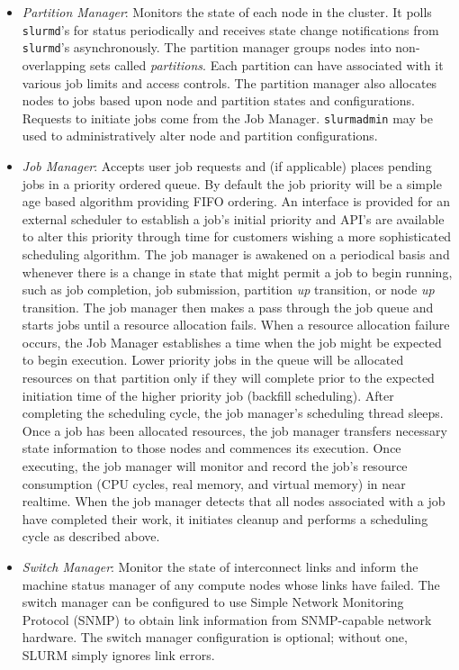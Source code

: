\begin{itemize}
\item {\em Partition Manager}: Monitors the state of each 
node in the cluster.  It polls {\tt slurmd}'s for status periodically and 
receives state change notifications from {\tt slurmd}'s asynchronously.
The partition manager groups nodes into non-overlapping sets 
called {\em partitions}. Each partition can have associated with 
it various job limits and access controls.
The partition manager also allocates nodes to jobs based upon 
node and partition states and configurations. Requests to initiate 
jobs come from the Job Manager.
{\tt slurmadmin} may be used to administratively alter node and 
partition configurations.

\item {\em Job Manager}: Accepts user job requests and (if applicable) 
places pending jobs in a priority ordered queue. By default the job 
priority will be a simple age based algorithm providing FIFO ordering. 
An interface is provided for an external scheduler to establish 
a job's initial priority and API's are available to alter this priority 
through time for customers wishing a more sophisticated scheduling algorithm.
The job manager is awakened on a periodical basis and whenever there is a change in state that 
might permit a job to begin running, such as job completion, job submission, 
partition {\em up} transition, or node {\em up} transition.
The job manager then makes a pass through the job queue and
starts jobs until a resource allocation fails. 
When a resource allocation failure occurs, the Job Manager establishes 
a time when the job might be expected to begin execution. 
Lower priority jobs in the queue will be allocated resources on that 
partition only if they will complete prior to the expected initiation 
time of the higher priority job (backfill scheduling).
After completing the scheduling cycle, the job manager's scheduling 
thread sleeps.
Once a job has been allocated resources, the job manager transfers 
necessary state information to those nodes and commences its execution. 
Once executing, the job manager will monitor and record the job's resource 
consumption (CPU cycles, real memory, and virtual memory) in near realtime.
When the job manager detects that all nodes associated with a 
job have completed their work, it initiates cleanup and performs a 
scheduling cycle as described above.

\item {\em Switch Manager}:  Monitor the state of interconnect links 
and inform the machine status manager of any compute nodes whose links
have failed.  The switch manager can be configured
to use Simple Network Monitoring Protocol (SNMP) to obtain link
information from SNMP-capable network hardware.
The switch manager configuration is optional;  without one, 
SLURM simply ignores link errors.

\end{itemize}

